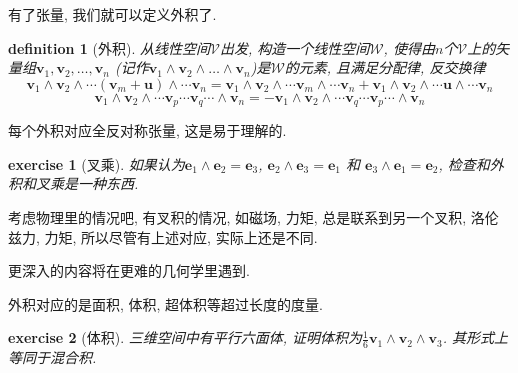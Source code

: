 \documentclass[12pt]{ctexbook}
\newtheorem{definition}{definition}
\numberwithin{definition}{section}
\numberwithin{theorem}{section}
\newtheorem{exercise}{exercise}
\numberwithin{exercise}{section}
\numberwithin{example}{section}
\numberwithin{lemma}{section}
\begin{document}

    有了张量, 我们就可以定义外积了.

    \begin{definition}
        [外积] 从线性空间\(\mathcal{V}\)出发, 构造一个线性空间\(\mathcal{W}\),
        使得由\(n\)个\(\mathcal{V}\)上的矢量组\(\boldsymbol{v}_1, \boldsymbol{v}_2, \ldots, \boldsymbol{v}_n\)
        (记作\(\boldsymbol{v}_1 \wedge \boldsymbol{v}_2 \wedge \ldots \wedge \boldsymbol{v}_n\))是\(\mathcal{W}\)的元素, 且满足分配律, 反交换律
        \begin{equation}
            \boldsymbol{v}_1 \wedge \boldsymbol{v}_2 \wedge \cdots (\boldsymbol{v}_m + \boldsymbol{u}) \wedge \cdots \boldsymbol{v}_n = 
            \boldsymbol{v}_1 \wedge \boldsymbol{v}_2 \wedge \cdots \boldsymbol{v}_m \wedge \cdots \boldsymbol{v}_n + \boldsymbol{v}_1 \wedge \boldsymbol{v}_2 \wedge \cdots \boldsymbol{u} \wedge \cdots \boldsymbol{v}_n
        \end{equation}
        \begin{equation}
            \boldsymbol{v}_1 \wedge \boldsymbol{v}_2 \wedge \cdots \boldsymbol{v}_p \cdots \boldsymbol{v}_q \cdots \wedge \boldsymbol{v}_n = 
            - \boldsymbol{v}_1 \wedge \boldsymbol{v}_2 \wedge \cdots \boldsymbol{v}_q \cdots \boldsymbol{v}_p \cdots \wedge \boldsymbol{v}_n
        \end{equation}
    \end{definition}

    每个外积对应全反对称张量, 这是易于理解的.

    \begin{exercise}
        [叉乘] 如果认为\(\boldsymbol{e}_1 \wedge \boldsymbol{e}_2 = \boldsymbol{e}_3\),
        \(\boldsymbol{e}_2 \wedge \boldsymbol{e}_3 = \boldsymbol{e}_1\) 和 \(\boldsymbol{e}_3 \wedge \boldsymbol{e}_1 = \boldsymbol{e}_2\),
        检查和外积和叉乘是一种东西.
    \end{exercise}

    考虑物理里的情况吧, 有叉积的情况, 如磁场, 力矩, 总是联系到另一个叉积, 洛伦兹力, 力矩, 所以尽管有上述对应, 实际上还是不同.

    更深入的内容将在更难的几何学里遇到.

    外积对应的是面积, 体积, 超体积等超过长度的度量.

    \begin{exercise}
        [体积] 三维空间中有平行六面体, 证明体积为\(\frac{1}{6} \boldsymbol{v}_1 \wedge \boldsymbol{v}_2 \wedge \boldsymbol{v}_3\).
        其形式上等同于混合积.
    \end{exercise}
\end{document}

